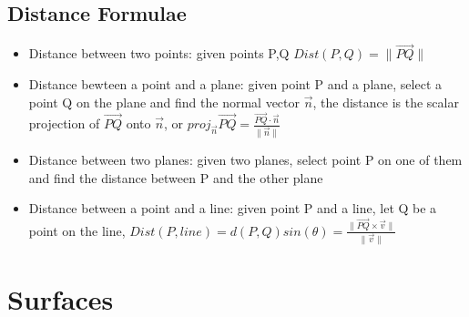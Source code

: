 \documentclass [12 pt, oneside] {book}
\begin{document}
\subsection{Distance Formulae}
\begin{itemize}
\item Distance between two points: given points P,Q $Dist(P,Q)=\|\vec{PQ}\|$
\item Distance bewteen a point and a plane: given point P and a plane, select a point Q on the plane and find the normal vector $\vec{n}$, the distance is the scalar projection of $\vec{PQ}$ onto $\vec{n}$, or $proj_{\vec{n}}\vec{PQ}=\frac{\vec{PQ}\cdot\vec{n}}{\|\vec{n}\|}$
\item Distance between two planes: given two planes, select point P on one of them and find the distance between P and the other plane
\item Distance between a point and a line: given point P and a line, let Q be a point on the line, $Dist(P ,line)=d(P,Q)sin(\theta) = \frac{\|\vec{PQ}\times\vec{v}\|}{\|\vec{v}\|}$
\end{itemize}

\section{Surfaces}
\end{document}
